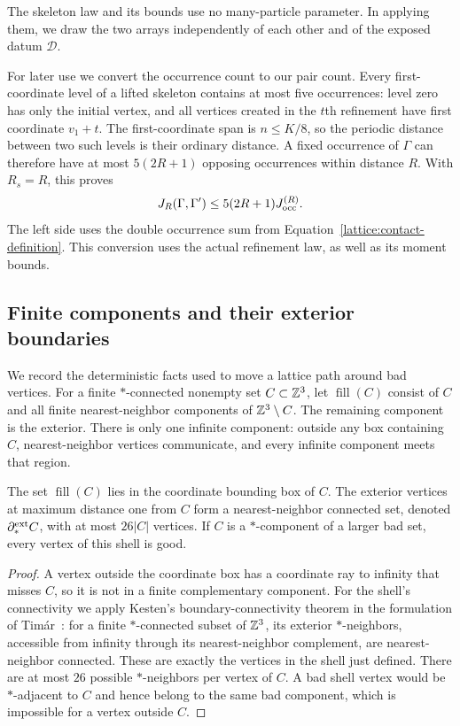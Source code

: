 The skeleton law and its bounds use no many-particle parameter.  In
applying them, we draw the two arrays independently of each other and
of the exposed datum $\mathcal D$.

For later use we convert the occurrence count to our pair count. Every
first-coordinate level of a lifted skeleton contains at most five
occurrences: level zero has only the initial vertex, and all vertices
created in the $t$th refinement have first coordinate $v_1+t$.
The first-coordinate span is $n\le K/8$, so the periodic distance between
two such levels is their ordinary distance. A fixed occurrence of $\Gamma$
can therefore have at most $5(2R+1)$ opposing occurrences within distance
$R$. With $R_s=R$, this proves
\begin{equation}\label{lattice:pair-occurrence}
 J_R(\Gamma,\Gamma')\le 5(2R+1)J_{\rm occ}^{(R)}.
\end{equation}
The left side uses the double occurrence sum from
Equation~\eqref{lattice:contact-definition}. This conversion uses the actual
refinement law, as well as its moment bounds.

\subsection{Finite components and their exterior boundaries}

We record the deterministic facts used to move a lattice path around
bad vertices.  For a finite $*$-connected nonempty set $C\subset\mathbb Z^3$,
let $\operatorname{fill}(C)$ consist of $C$ and all finite
nearest-neighbor components of $\mathbb Z^3\setminus C$.  The remaining
component is the exterior.  There is only one infinite component:
outside any box containing $C$, nearest-neighbor vertices communicate,
and every infinite component meets that region.

\begin{lemma}\label{lattice:boundary}
The set $\operatorname{fill}(C)$ lies in the coordinate bounding box of
$C$.  The exterior vertices at maximum distance one from $C$ form a
nearest-neighbor connected set, denoted $\partial_*^{\rm ext}C$,
with at most $26|C|$ vertices.  If $C$ is a $*$-component of a larger
bad set, every vertex of this shell is good.
\end{lemma}
\begin{proof}
A vertex outside the coordinate box has a coordinate ray to infinity
that misses $C$, so it is not in a finite complementary component.
For the shell's connectivity we apply Kesten's boundary-connectivity
theorem in the formulation of Tim\'ar~\cite[arXiv version~2, Theorem~4]{Timar2013}:
for a finite $*$-connected subset of $\mathbb Z^3$, its exterior
$*$-neighbors, accessible from infinity through its nearest-neighbor
complement, are nearest-neighbor connected.  These are exactly the
vertices in the shell just defined.  There are at most $26$ possible
$*$-neighbors per vertex of $C$.  A bad shell vertex would be
$*$-adjacent to $C$ and hence belong to the same bad component,
which is impossible for a vertex outside $C$.
\end{proof}

